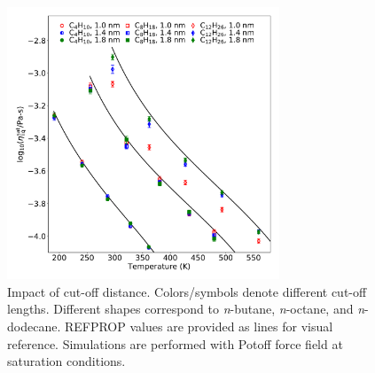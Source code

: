 \documentclass[preprint,review,12pt]{elsarticle}
\begin{document}
	\begin{figure}[htb!]
		\centering
		\includegraphics[width=3.2in]{cutoff_distance.pdf}
		\caption{Impact of cut-off distance. Colors/symbols denote different cut-off lengths. Different shapes correspond to \textit{n}-butane, \textit{n}-octane, and \textit{n}-dodecane. REFPROP values are provided as lines for visual reference. Simulations are performed with Potoff force field at saturation conditions.}
		\label{fig:cutoff_distance}
	\end{figure} 
\end{document}
